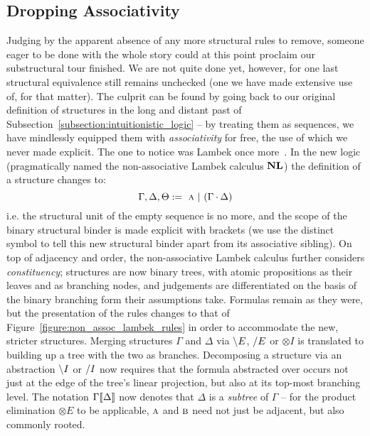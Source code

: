 \subsection{Dropping Associativity}
Judging by the apparent absence of any more structural rules to remove, someone eager to be done with the whole story could at this point proclaim our substructural tour finished.
We are not quite done yet, however, for one last structural equivalence still remains unchecked (one we have made extensive use of, for that matter).
The culprit can be found by going back to our original definition of structures in the long and distant past of Subsection~\ref{subsection:intuitionistic_logic} -- by treating them as sequences, we have mindlessly equipped them with \textit{associativity} for free, the use of which we never made explicit.
The one to notice was Lambek once more~\cite{lambek1961calculus}.
In the new logic (pragmatically named the non-associative Lambek calculus $\textbf{NL}$) the definition of a structure changes to:
\begin{equation}
	\Gamma, \Delta, \Theta := \ \prop{a} \ | \ (\Gamma \sbind \Delta)
\end{equation}
i.e. the structural unit of the empty sequence is no more, and the scope of the binary structural binder is made explicit with brackets (we use the distinct symbol \sbind{} to tell this new structural binder apart from its associative sibling).
On top of adjacency and order, the non-associative Lambek calculus further considers \textit{constituency}; structures are now binary trees, with atomic propositions as their leaves and \sbind{} as branching nodes, and judgements are differentiated on the basis of the binary branching form their assumptions take.
Formulas remain as they were, but the presentation of the rules changes to that of Figure~\ref{figure:non_assoc_lambek_rules} in order to accommodate the new, stricter structures.
Merging structures $\Gamma$ and $\Delta$ via $\backslash E$, $/ E$ or $\otimes I$ is translated to building up a tree with the two as branches.
Decomposing a structure via an abstraction $\backslash I$ or $/ I$ now requires that the formula abstracted over occurs not just at the edge of the tree's linear projection, but also at its top-most branching level.
The notation $\Gamma\llbracket{\Delta}\rrbracket$ now denotes that $\Delta$ is a \textit{subtree} of $\Gamma$ -- for the product elimination $\otimes E$ to be applicable, $\prop{a}$ and $\prop{b}$ need not just be adjacent, but also commonly rooted.

